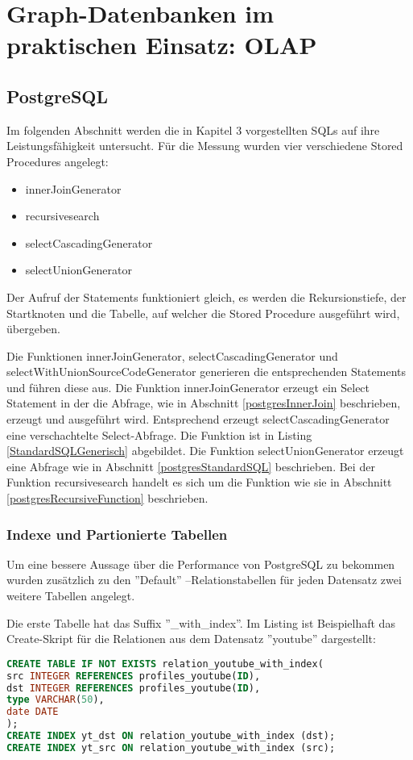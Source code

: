\chapter{Graph-Datenbanken im praktischen Einsatz: OLAP}
\section{PostgreSQL}
Im folgenden Abschnitt werden die in Kapitel 3 vorgestellten SQLs auf ihre Leistungsfähigkeit untersucht. Für die Messung wurden vier verschiedene Stored Procedures angelegt:
\begin{itemize}
	\item innerJoinGenerator
	\item recursivesearch
	\item selectCascadingGenerator
	\item selectUnionGenerator
\end{itemize}
Der Aufruf der Statements funktioniert gleich, es werden die Rekursionstiefe, der Startknoten und die Tabelle, auf welcher die Stored Procedure ausgeführt wird, übergeben.

Die Funktionen innerJoinGenerator, selectCascadingGenerator und selectWithUnionSourceCodeGenerator generieren die entsprechenden Statements und führen diese aus. Die Funktion innerJoinGenerator erzeugt ein Select Statement in der die Abfrage, wie in Abschnitt \ref{postgresInnerJoin} beschrieben, erzeugt und ausgeführt wird. Entsprechend erzeugt selectCascadingGenerator eine verschachtelte Select-Abfrage. Die Funktion ist in Listing \ref{StandardSQLGenerisch} abgebildet. Die Funktion selectUnionGenerator erzeugt eine Abfrage wie in Abschnitt \ref{postgresStandardSQL} beschrieben. Bei der Funktion recursivesearch handelt es sich um die Funktion wie sie in Abschnitt \ref{postgresRecursiveFunction} beschrieben.

\subsection{Indexe und Partionierte Tabellen}
Um eine bessere Aussage über die Performance von PostgreSQL zu bekommen wurden zusätzlich zu den ''Default'' --Relationstabellen für jeden Datensatz zwei weitere Tabellen angelegt.

Die erste Tabelle hat das Suffix ''\_with\_index''. Im Listing ist Beispielhaft das Create-Skript für die Relationen aus dem Datensatz ''youtube'' dargestellt:

\begin{lstlisting}[language=SQL,caption = Tabelle mit Index anlegen,frame=single, label={2.tabelleIndex.listing} ]
CREATE TABLE IF NOT EXISTS relation_youtube_with_index(
src INTEGER REFERENCES profiles_youtube(ID),
dst INTEGER REFERENCES profiles_youtube(ID),
type VARCHAR(50),
date DATE
);
CREATE INDEX yt_dst ON relation_youtube_with_index (dst);
CREATE INDEX yt_src ON relation_youtube_with_index (src);
\end{lstlisting}

